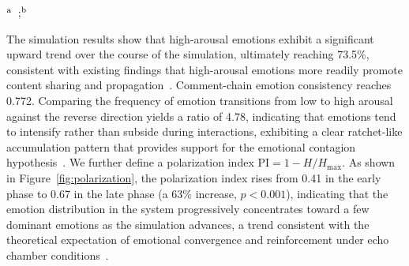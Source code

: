 \documentclass[a4paper,fleqn]{cas-dc}
\renewcommand{\footnotesize}{\scriptsize}
\begin{document}
\begin{table}[!t]
\centering
\caption{Emotional arousal theory validation metrics.}
\label{tab:emotion}
\renewcommand{\arraystretch}{1.0}
\vspace{3pt}
{\footnotesize $^{\rm a}$~\citet{berger_what_2012};\quad $^{\rm b}$~\citet{hatfield_emotional_1994}}
\end{table}

The simulation results show that high-arousal emotions exhibit a significant upward trend over the course of the simulation, ultimately reaching 73.5\%, consistent with existing findings that high-arousal emotions more readily promote content sharing and propagation~\citep{berger_what_2012}. Comment-chain emotion consistency reaches 0.772. Comparing the frequency of emotion transitions from low to high arousal against the reverse direction yields a ratio of 4.78, indicating that emotions tend to intensify rather than subside during interactions, exhibiting a clear ratchet-like accumulation pattern that provides support for the emotional contagion hypothesis~\citep{hatfield_emotional_1994}.
We further define a polarization index $\text{PI} = 1 - H/H_{\max}$. As shown in Figure~\ref{fig:polarization}, the polarization index rises from 0.41 in the early phase to 0.67 in the late phase (a 63\% increase, $p < 0.001$), indicating that the emotion distribution in the system progressively concentrates toward a few dominant emotions as the simulation advances, a trend consistent with the theoretical expectation of emotional convergence and reinforcement under echo chamber conditions~\citep{cinelli_echo_2021}.
\end{document}
